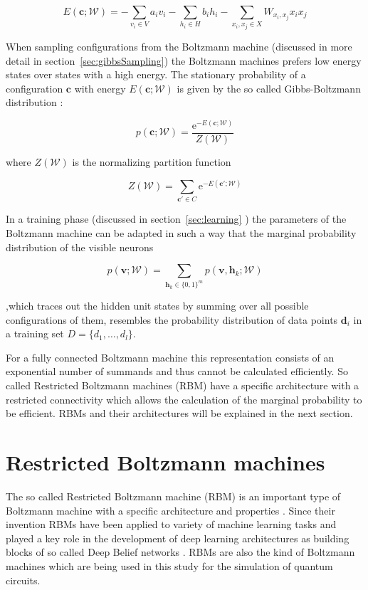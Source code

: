 \begin{equation}
  E(\bm{c};\mathcal{W}) = - \sum_{v_i \in V} a_{i}v_{i} - \sum_{h_i \in H} b_{i}h_{i} - \sum_{x_i,x_j \in X} W_{x_i,x_j}x_{i}x_{j}
\end{equation}

When sampling configurations from the Boltzmann machine (discussed in more detail in section~\ref{sec:gibbsSampling}) the 
Boltzmann machines prefers low energy states over states with a high energy. The stationary probability
of a configuration $\bm{c}$ with energy $E(\bm{c};\mathcal{W})$ is given by the so called Gibbs-Boltzmann distribution \cite{gibbs_2010}:

\begin{equation}
   p(\bm{c};\mathcal{W}) = \frac{\mathrm{e}^{-E(\bm{c};\mathcal{W})}}{Z(\mathcal{W})}
\end{equation}

where $Z(\mathcal{W})$ is the normalizing partition function 

\begin{equation}
   Z(\mathcal{W}) = \sum_{\bm{c}\prime\in C} \mathrm{e}^{-E(\bm{c}\prime;\mathcal{W})}
\end{equation}

In a training phase (discussed in section~\ref{sec:learning} ) the parameters of the Boltzmann machine can be adapted in such a way that 
the marginal probability distribution of the visible neurons

\begin{equation}
    \label{eq:gbm}
   p(\bm{v};\mathcal{W}) = \sum_{\bm{h}_k \in \{0,1\}^m} p(\bm{v},\bm{h}_k;\mathcal{W})
\end{equation}

,which traces out the hidden unit 
states by summing over all possible configurations of them, resembles the probability 
distribution of data points $\bm{d}_i$ in a training set $D=\{d_1,\dots,d_l\}$.

For a fully connected Boltzmann machine this representation consists of an exponential number of 
summands and thus cannot be calculated efficiently. So called Restricted Boltzmann machines
(RBM) have a specific architecture with a restricted connectivity which allows the calculation 
of the marginal probability to be efficient. RBMs and their architectures will be explained in 
the next section.

\section{Restricted Boltzmann machines}
The so called Restricted Boltzmann machine (RBM) is an important type of Boltzmann machine with 
a specific architecture and properties \cite{smolensky1986information}. Since their invention RBMs have been applied to variety 
of machine learning tasks and played a 
key role in the development of deep learning architectures as building blocks of so called 
Deep Belief networks \cite{bengio2009learning, hinton2006fast}.
RBMs are also the kind of Boltzmann machines which are being used in this study for the simulation 
of quantum circuits.

